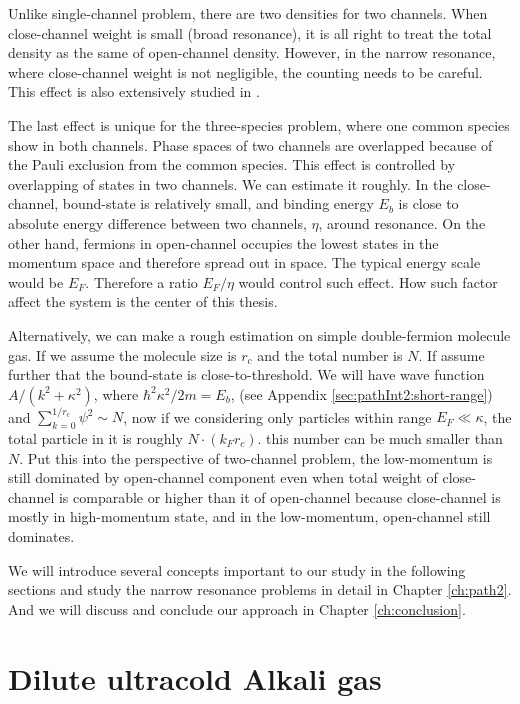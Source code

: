 Unlike single-channel problem, there are two densities for two channels. When close-channel weight is small (broad resonance), it is all right to treat the total density as the same of open-channel density.  However, in the narrow resonance, where close-channel weight is not negligible, the counting needs to be careful.  This effect is also extensively studied in \cite{GurarieNarrow}.

The last effect is unique for the three-species problem, where one common species show in both channels.  Phase spaces of two channels are overlapped because of the Pauli exclusion from the common species. This effect is controlled by overlapping of states in two channels. We can estimate it roughly.  In the close-channel, bound-state is relatively small, and binding energy $E_b$ is close to absolute energy difference between two channels, $\eta$, around resonance.  On the other hand, fermions in open-channel occupies the lowest states in the momentum space and therefore spread out in space.  The typical energy scale would be $E_F$.  Therefore a ratio $E_F/\eta$ would control such effect. How such factor affect the system is the center of this thesis. 

Alternatively, we can make a rough estimation on simple double-fermion molecule gas.  If we assume the molecule size is $r_{c}$ and the total number is $N$.  If assume further that the bound-state is close-to-threshold.  We will have wave function $A/(k^{2}+\kappa^{2})$, where $\hbar^{2}\kappa^{2}/2m=E_{b}$, (see Appendix \ref{sec:pathInt2:short-range}) and $\sum_{k=0}^{1/r_{c}}\psi^{2}\sim{}N$, now if we considering only particles within range $E_{F}\ll\kappa$, the total particle in it is roughly $N\cdot(k_{F}r_{c})$.  this number can be much smaller than $N$. Put this into the perspective of two-channel problem, the low-momentum is still dominated by open-channel component even when total weight of close-channel is comparable or higher than it of open-channel because close-channel is mostly in high-momentum state, and in the low-momentum, open-channel still dominates.     

We will introduce several concepts important to our study in the following sections and study the narrow resonance problems in detail in Chapter \ref{ch:path2}. And we will discuss and conclude our approach in Chapter \ref{ch:conclusion}.

\section{Dilute ultracold Alkali gas}
